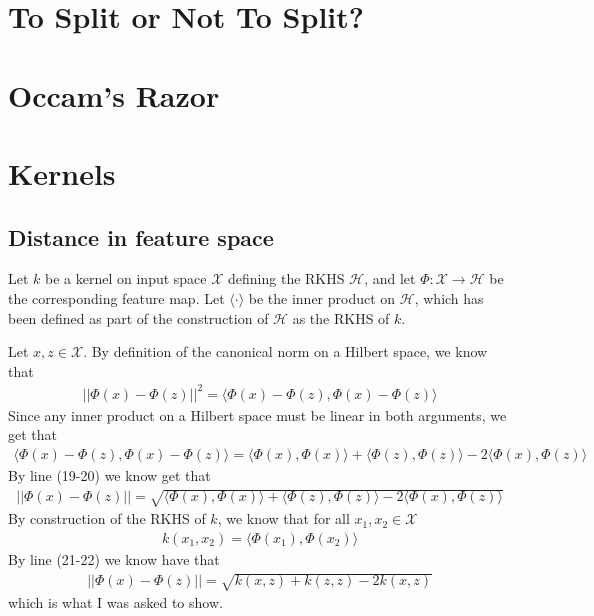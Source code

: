 \documentclass[12pt]{article}
\begin{document}
\section{To Split or Not To Split?}



\section{Occam's Razor}



\section{Kernels}

\subsection{Distance in feature space}



Let $k$ be a kernel on input space $\mathcal{X}$ defining the RKHS $\mathcal{H}$, and let $\Phi: \mathcal{X} \to \mathcal{H}$ be the corresponding feature map. Let $\langle \cdot \rangle$ be the inner product on $\mathcal{H}$, which has been defined as part of the construction of $\mathcal{H}$ as the RKHS of $k$. 

Let $x,z\in \mathcal{X}$. By definition of the canonical norm on a Hilbert space, we know that
\begin{align}
||\Phi(x) - \Phi(z) ||^2 = \langle \Phi(x) - \Phi(z),\Phi(x) - \Phi(z) \rangle
\end{align}
Since any inner product on a Hilbert space must be linear in both arguments, we get that
\begin{align}
\langle \Phi(x) - \Phi(z),\Phi(x) - \Phi(z) \rangle = 
\langle \Phi(x),\Phi(x) \rangle + \langle \Phi(z),\Phi(z) \rangle - 2\langle \Phi(x) , \Phi(z) \rangle
\end{align}
By line (19-20) we know get that
\begin{align}
||\Phi(x) - \Phi(z) || = \sqrt{\langle \Phi(x),\Phi(x) \rangle + \langle \Phi(z),\Phi(z) \rangle - 2\langle \Phi(x) , \Phi(z) \rangle}
\end{align}
By construction of the RKHS of $k$, we know that for all $x_1, x_2 \in \mathcal{X}$
\begin{align}
k(x_1,x_2)=\langle \Phi(x_1), \Phi(x_2) \rangle
\end{align}
By line (21-22) we know have that
\begin{align}
||\Phi(x) - \Phi(z) || = \sqrt{k(x,z) + k(z,z) - 2k(x,z)}
\end{align}
which is what I was asked to show.
\end{document}
